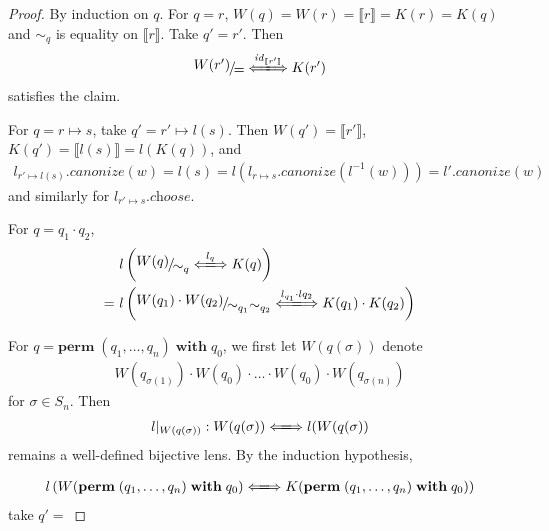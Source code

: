\documentclass[a4paper,11pt] {article}
\theoremstyle{definition}
\newcommand{\lcanonize}[1]{\textit{$#1$.canonize}}
\newcommand{\lchoose}[1]{\textit{$#1$.choose}}
\newcommand{\lensbetween}[1]{\xLongleftrightarrow{#1}}
\newcommand{\perm}{ \textbf{perm}\; }
\newcommand{\with}{ \;\textbf{with}\; }
\newcommand{\niceFrac}[2]{%
    \raise.5ex\hbox{$#1$}%
    \kern-.1em/\kern-.15em%
    \lower.25ex\hbox{$#2$}}
\begin{document}
\begin{proof}
  By induction on $q$.
  For $q = r$, $W(q) = W(r) = \llbracket r \rrbracket = K(r) = K(q)$ and
  $\sim_q$ is equality on $\llbracket r \rrbracket$.
  Take $q' = r'$. Then
  \begin{align*}
    \niceFrac{W(r')}{=}
    \lensbetween{\mathit{id}_{\llbracket r' \rrbracket}} K(r')
  \end{align*}
  satisfies the claim.

  For $q = r \mapsto s$, take $q' = r' \mapsto l(s)$. Then
  $W(q') = \llbracket r' \rrbracket$,
  $K(q') = \llbracket l(s) \rrbracket = l(K(q))$,
  and
  \begin{align*}
    \lcanonize{l_{r' \mapsto l(s)}}(w)
    = l(s)
    = l(\lcanonize{l_{r \mapsto s}}(l^{-1}(w)))
    = \lcanonize{l'}(w)
  \end{align*}
  and similarly for $\lchoose{l_{r' \mapsto s}}$.

  For $q = q_1 \cdot q_2$,
  \begin{align*}
    &l \left(\niceFrac{W(q)}{\sim_q} \lensbetween{l_q} K(q) \right) \\
    =~& l\left(\niceFrac{W(q_1) \cdot W(q_2)}{\sim_{q_1}\sim_{q_2}}
    \lensbetween{l_{q_1} \cdot l{q_2}}
    K(q_1) \cdot K(q_2) \right)
  \end{align*}
  
  
  For $q = \perm(q_1, \ldots, q_n) \with q_0$,
  we first let $W(q(\sigma))$ denote
  \begin{align*}
    W(q_{\sigma(1)}) \cdot W(q_0) \cdot \ldots \cdot W(q_0) \cdot
    W(q_{\sigma(n)})
  \end{align*}
  for $\sigma \in S_n$.
  Then 
  \begin{align*}
    l |_{W(q(\mathit{\sigma}))} :
    W(q(\mathit{\sigma})) \lensbetween{}
    l(W(q(\mathit{\sigma}))
  \end{align*}
  remains a well-defined bijective lens.
  By the induction hypothesis, 
  
  \begin{align*}
    l \left( W(\perm(q_1, \ldots, q_n) \with q_0) \lensbetween{}
    K(\perm(q_1, \ldots, q_n) \with q_0) \right)
  \end{align*}
  take $q' = $
    
    
\end{proof}
\end{document}
